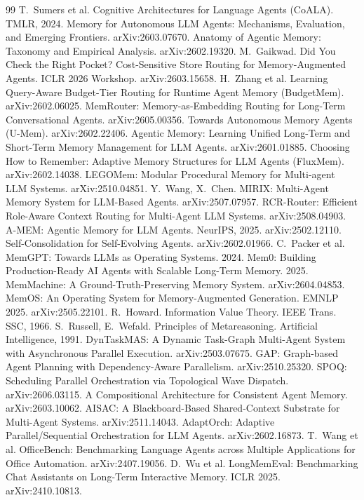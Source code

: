 \documentclass[10pt,twocolumn]{article}
\begin{document}
\begin{thebibliography}{99}\small
{} T.~Sumers et al. Cognitive Architectures for Language Agents (CoALA). TMLR, 2024.
 Memory for Autonomous LLM Agents: Mechanisms, Evaluation, and Emerging Frontiers. arXiv:2603.07670.
 Anatomy of Agentic Memory: Taxonomy and Empirical Analysis. arXiv:2602.19320.
 M.~Gaikwad. Did You Check the Right Pocket? Cost-Sensitive Store Routing for Memory-Augmented Agents. ICLR 2026 Workshop. arXiv:2603.15658.
 H.~Zhang et al. Learning Query-Aware Budget-Tier Routing for Runtime Agent Memory (BudgetMem). arXiv:2602.06025.
 MemRouter: Memory-as-Embedding Routing for Long-Term Conversational Agents. arXiv:2605.00356.
 Towards Autonomous Memory Agents (U-Mem). arXiv:2602.22406.
 Agentic Memory: Learning Unified Long-Term and Short-Term Memory Management for LLM Agents. arXiv:2601.01885.
 Choosing How to Remember: Adaptive Memory Structures for LLM Agents (FluxMem). arXiv:2602.14038.
 LEGOMem: Modular Procedural Memory for Multi-agent LLM Systems. arXiv:2510.04851.
 Y.~Wang, X.~Chen. MIRIX: Multi-Agent Memory System for LLM-Based Agents. arXiv:2507.07957.
 RCR-Router: Efficient Role-Aware Context Routing for Multi-Agent LLM Systems. arXiv:2508.04903.
 A-MEM: Agentic Memory for LLM Agents. NeurIPS, 2025. arXiv:2502.12110.
 Self-Consolidation for Self-Evolving Agents. arXiv:2602.01966.
 C.~Packer et al. MemGPT: Towards LLMs as Operating Systems. 2024.
 Mem0: Building Production-Ready AI Agents with Scalable Long-Term Memory. 2025.
 MemMachine: A Ground-Truth-Preserving Memory System. arXiv:2604.04853.
 MemOS: An Operating System for Memory-Augmented Generation. EMNLP 2025. arXiv:2505.22101.
 R.~Howard. Information Value Theory. IEEE Trans. SSC, 1966.
 S.~Russell, E.~Wefald. Principles of Metareasoning. Artificial Intelligence, 1991.
 DynTaskMAS: A Dynamic Task-Graph Multi-Agent System with Asynchronous Parallel Execution. arXiv:2503.07675.
 GAP: Graph-based Agent Planning with Dependency-Aware Parallelism. arXiv:2510.25320.
 SPOQ: Scheduling Parallel Orchestration via Topological Wave Dispatch. arXiv:2606.03115.
 A Compositional Architecture for Consistent Agent Memory. arXiv:2603.10062.
 AISAC: A Blackboard-Based Shared-Context Substrate for Multi-Agent Systems. arXiv:2511.14043.
 AdaptOrch: Adaptive Parallel/Sequential Orchestration for LLM Agents. arXiv:2602.16873.
 T.~Wang et al. OfficeBench: Benchmarking Language Agents across Multiple Applications for Office Automation. arXiv:2407.19056.
 D.~Wu et al. LongMemEval: Benchmarking Chat Assistants on Long-Term Interactive Memory. ICLR 2025. arXiv:2410.10813.
\end{thebibliography}
\end{document}
